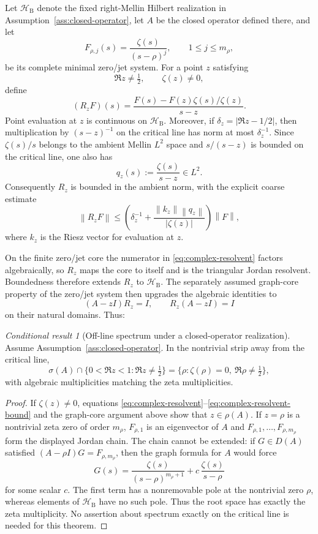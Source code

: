 \documentclass[11pt]{article}
\theoremstyle{remark}
\newcommand{\norm}[1]{\left\lVert #1\right\rVert}
\newtheorem{conditionalresult}[theorem]{Conditional result}
\begin{document}
Let $\mathscr H_{\mathrm B}$ denote the fixed right-Mellin Hilbert realization in Assumption~\ref{ass:closed-operator}, let $A$ be the closed operator defined there, and let
\[
 F_{\rho,j}(s)=\frac{\zeta(s)}{(s-\rho)^j},\qquad 1\le j\le m_\rho,
\]
be its complete minimal zero/jet system.  For a point $z$ satisfying
\[
 \Re z\ne\tfrac12,\qquad \zeta(z)\ne0,
\]
define
\begin{equation}\label{eq:complex-resolvent}
 (R_zF)(s)=\frac{F(s)-F(z)\zeta(s)/\zeta(z)}{s-z}.
\end{equation}
Point evaluation at $z$ is continuous on $\mathscr H_{\mathrm B}$.  Moreover, if
$\delta_z=|\Re z-1/2|$, then multiplication by $(s-z)^{-1}$ on the critical line has norm at most $\delta_z^{-1}$.  Since $\zeta(s)/s$ belongs to the ambient Mellin $L^2$ space and $s/(s-z)$ is bounded on the critical line, one also has
\[
 q_z(s):=\frac{\zeta(s)}{s-z}\in L^2.
\]
Consequently $R_z$ is bounded in the ambient norm, with the explicit coarse estimate
\begin{equation}\label{eq:complex-resolvent-bound}
 \norm{R_zF}
 \le\left(\delta_z^{-1}+\frac{\norm{k_z}\norm{q_z}}{|\zeta(z)|}\right)\norm F,
\end{equation}
where $k_z$ is the Riesz vector for evaluation at $z$.

On the finite zero/jet core the numerator in \eqref{eq:complex-resolvent} factors algebraically, so $R_z$ maps the core to itself and is the triangular Jordan resolvent.  Boundedness therefore extends $R_z$ to $\mathscr H_{\mathrm B}$.  The separately assumed graph-core property of the zero/jet system then upgrades the algebraic identities to
\[
 (A-zI)R_z=I,\qquad R_z(A-zI)=I
\]
on their natural domains.  Thus:

\begin{conditionalresult}[Off-line spectrum under a closed-operator realization]\label{thm:off-line-spectrum}
Assume Assumption~\ref{ass:closed-operator}. In the nontrivial strip away from the critical line,
\[
 \sigma(A)\cap\{0<\Re z<1:\Re z\ne\tfrac12\}
 =\{\rho:\zeta(\rho)=0,\ \Re\rho\ne\tfrac12\},
\]
with algebraic multiplicities matching the zeta multiplicities.
\end{conditionalresult}
\begin{proof}
If $\zeta(z)\ne0$, equations \eqref{eq:complex-resolvent}--\eqref{eq:complex-resolvent-bound} and the graph-core argument above show that $z\in\rho(A)$.  If $z=\rho$ is a nontrivial zeta zero of order $m_\rho$, $F_{\rho,1}$ is an eigenvector of $A$ and $F_{\rho,1},\ldots,F_{\rho,m_\rho}$ form the displayed Jordan chain.  The chain cannot be extended: if $G\in D(A)$ satisfied $(A-\rho I)G=F_{\rho,m_\rho}$, then the graph formula for $A$ would force
\[
 G(s)=\frac{\zeta(s)}{(s-\rho)^{m_\rho+1}}
      +c\,\frac{\zeta(s)}{s-\rho}
\]
for some scalar $c$.  The first term has a nonremovable pole at the nontrivial zero $\rho$, whereas elements of $\mathscr H_{\mathrm B}$ have no such pole.  Thus the root space has exactly the zeta multiplicity.  No assertion about spectrum exactly on the critical line is needed for this theorem.
\end{proof}
\end{document}
